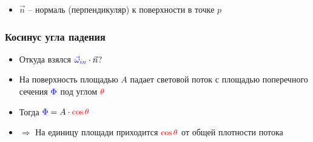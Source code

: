 \documentclass{beamer}
\begin{document}
\begin{frame}[fragile]
\begin{itemize}
\pause
\item \begin{math}\vec n\end{math} -- нормаль (перпендикуляр) к поверхности в точке \begin{math}p\end{math}
\end{itemize}
\end{frame}

\begin{frame}[fragile]
\frametitle{Косинус угла падения}
\begin{itemize}
\item Откуда взялся \begin{math}{\color{blue}\vec\omega_{in}} \cdot \vec{n}\end{math}?
\pause
\item На поверхность площадью \begin{math}A\end{math} падает световой поток с площадью поперечного сечения \begin{math}{\color{blue} \Phi}\end{math} под углом \begin{math}\color{red}\theta\end{math}
\item Тогда \begin{math}{\color{blue} \Phi} = A \cdot {\color{red} \cos \theta}\end{math}
\item \begin{math}\Rightarrow\end{math} На единицу площади приходится \begin{math}{\color{red}\cos \theta}\end{math} от общей плотности потока
\end{itemize}
\begin{center}
\end{center}
\end{frame}
\end{document}

